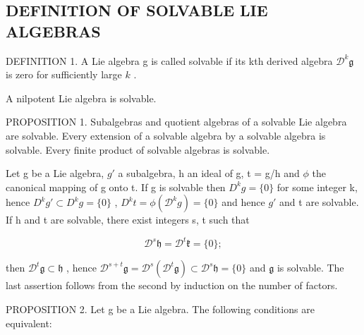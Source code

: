 \subsection{DEFINITION OF SOLVABLE LIE ALGEBRAS}

DEFINITION 1. A Lie algebra g is called solvable if its kth derived algebra \(\mathcal{D}^{k}\mathfrak{g}\) is zero for sufficiently large \(k\) .

A nilpotent Lie algebra is solvable.

PROPOSITION 1. Subalgebras and quotient algebras of a solvable Lie algebra are solvable. Every extension of a solvable algebra by a solvable algebra is solvable. Every finite product of solvable algebras is solvable.

Let g be a Lie algebra, \(g'\) a subalgebra, h an ideal of g, t = g/h and \(\phi\) the canonical mapping of g onto t. If g is solvable then \(D^{k}g = \{0\}\) for some integer k, hence \(D^{k}g' \subset D^{k}g = \{0\}\) , \(D^{k}t = \phi(\mathcal{D}^{k}g) = \{0\}\) and hence \(g'\) and t are solvable. If h and t are solvable, there exist integers s, t such that

\[
\mathcal {D} ^ {s} \mathfrak {h} = \mathcal {D} ^ {t} \mathfrak {k} = \{0 \};
\]

then \(\mathcal{D}^t\mathfrak{g}\subset \mathfrak{h}\) , hence \(\mathcal{D}^{s + t}\mathfrak{g} = \mathcal{D}^{s}(\mathcal{D}^{t}\mathfrak{g})\subset \mathcal{D}^{s}\mathfrak{h} = \{0\}\) and \(\mathfrak{g}\) is solvable. The last assertion follows from the second by induction on the number of factors.

PROPOSITION 2. Let g be a Lie algebra. The following conditions are equivalent:

